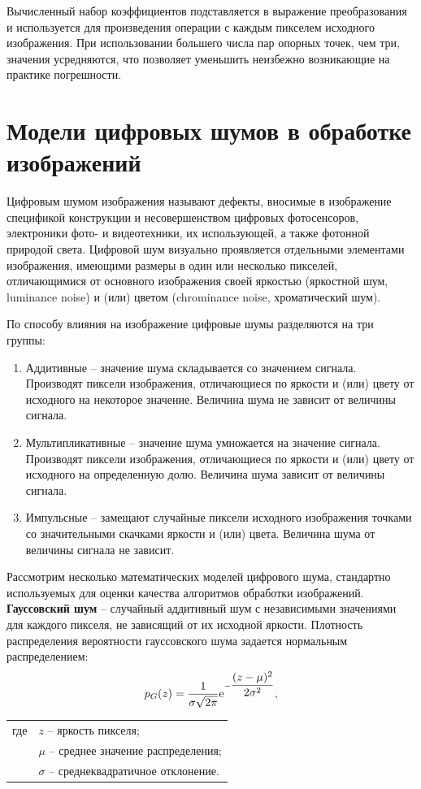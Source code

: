 {{	
	Вычисленный набор коэффициентов подставляется в выражение преобразования и используется для произведения операции с каждым пикселем исходного изображения.
	При использовании большего числа пар опорных точек, чем три, значения усредняются, что позволяет уменьшить неизбежно возникающие на практике погрешности.
}
}
\newpage

\section{Модели цифровых шумов в обработке изображений}
{
	Цифровым шумом изображения называют дефекты, вносимые в изображение спецификой конструкции и несовершенством цифровых фотосенсоров, электроники фото- и видеотехники, их использующей, а также фотонной природой света. 
	Цифровой шум визуально проявляется отдельными элементами изображения, имеющими размеры в один или несколько пикселей, отличающимися от основного изображения своей яркостью (яркостной шум, luminance noise) и (или) цветом (chrominance noise, хроматический шум). 
	
	По способу влияния на изображение цифровые шумы разделяются на три группы:
	\begin{enumerate}%
		\item Аддитивные -- значение шума складывается со значением сигнала. Производят пиксели изображения, отличающиеся по яркости и (или) цвету от исходного на некоторое значение. Величина шума не зависит от величины сигнала.
		\item Мультипликативные -- значение шума умножается на значение сигнала. Производят пиксели изображения, отличающиеся по яркости и (или) цвету от исходного на определенную долю. Величина шума зависит от величины сигнала.
		\item Импульсные -- замещают случайные пиксели исходного изображения точками со значительными скачками яркости и (или) цвета. Величина шума от величины сигнала не зависит.
	\end{enumerate}
	
	Рассмотрим несколько математических моделей цифрового шума, стандартно используемых для оценки качества алгоритмов обработки изображений.\\
	
	{\bf Гауссовский шум} -- случайный аддитивный шум с независимыми значениями для каждого пикселя, не зависящий от их исходной яркости. Плотность распределения вероятности гауссовского шума задается нормальным распределением:
	$$p_G(z)=\dfrac{1}{\sigma\sqrt{2\pi}}{\rm e}^{-\dfrac{(z-\mu)^2}{2\sigma^2}},$$
	\begin{tabular}{ rl }
		где 
		& $z$ -- яркость пикселя;\\
		& $\mu$ -- среднее значение распределения; \\
		& $\sigma$ -- среднеквадратичное отклонение. \\
	\end{tabular}\\

}
